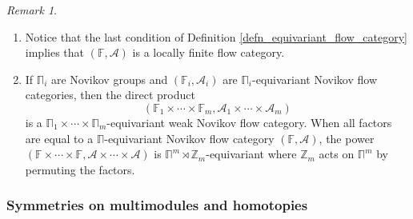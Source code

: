 \documentclass[reqno, 10pt]{amsart}
\numberwithin{equation}{section}
\numberwithin{equation}{section}
\theoremstyle{definition}
\theoremstyle{remark}
\newtheorem{rem}[thm]{Remark}
\newcommand{\beqn}{\begin{equation*}}
\newcommand{\eeqn}{\end{equation*}}
\newcommand{\mb}{\mathbb}
\newcommand{\mc}{\mathcal}
\begin{document}
\begin{rem}
\begin{enumerate}

\item Notice that the last condition of Definition \ref{defn_equivariant_flow_category} implies that $({\mb F}, {\mc A})$ is a locally finite flow category. 

\item If $\mb\Pi_i$ are Novikov groups and $({\mb F}_i, {\mc A}_i)$ are $\mb\Pi_i$-equivariant Novikov flow categories, then the direct product
\beqn
({\mb F}_1 \times \cdots \times {\mb F}_m, {\mc A}_1 \times \cdots \times {\mc A}_m)
\eeqn
is a $\mb \Pi_1 \times \cdots \times \mb\Pi_m$-equivariant weak Novikov flow category. When all factors are equal to a $\mb\Pi$-equivariant Novikov flow category $({\mb F}, {\mc A})$, the power $({\mb F} \times \cdots \times {\mb F}, {\mc A} \times \cdots \times {\mc A})$ is $\mb\Pi^m \rtimes {\mb Z}_m$-equivariant where ${\mb Z}_m$ acts on $\mb\Pi^m$ by permuting the factors. 
\end{enumerate}
\end{rem}










\subsubsection{Symmetries on multimodules and homotopies}
\end{document}
